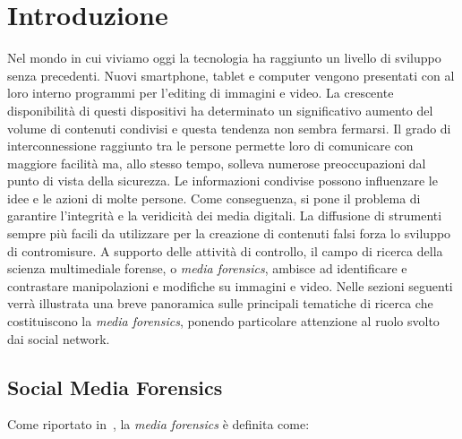 \chapter{Introduzione}
\label{cha:intro}

Nel mondo in cui viviamo oggi la tecnologia ha raggiunto un livello di sviluppo senza precedenti. Nuovi smartphone, tablet e computer vengono presentati con al loro interno programmi per l'editing di immagini e video. La crescente disponibilità di questi dispositivi ha determinato un significativo aumento del volume di contenuti condivisi e questa tendenza non sembra fermarsi. Il grado di interconnessione raggiunto tra le persone permette loro di comunicare con maggiore facilità ma, allo stesso tempo, solleva numerose preoccupazioni dal punto di vista della sicurezza. Le informazioni condivise possono influenzare le idee e le azioni di molte persone. Come conseguenza, si pone il problema di garantire l'integrità e la veridicità dei media digitali. La diffusione di strumenti sempre più facili da utilizzare per la creazione di contenuti falsi forza lo sviluppo di contromisure. A supporto delle attività di controllo, il campo di ricerca della scienza multimediale forense, o \textit{media forensics}, ambisce ad identificare e contrastare manipolazioni e modifiche su immagini e video. Nelle sezioni seguenti verrà illustrata una breve panoramica sulle principali tematiche di ricerca che costituiscono la \textit{media forensics}, ponendo particolare attenzione al ruolo svolto dai social network.\\

\section{Social Media Forensics}
\label{sec:social_media_forensics}

Come riportato in~\cite{media_forensics_definition}, la \textit{media forensics} è definita come:

